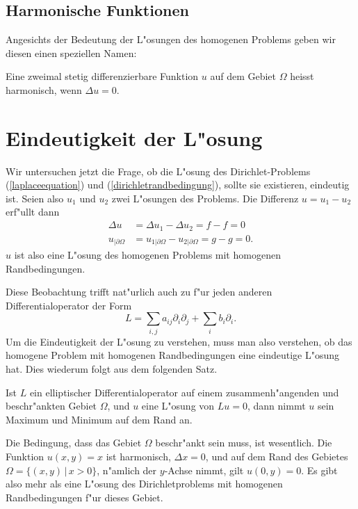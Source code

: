 \subsection{Harmonische Funktionen}
Angesichts der Bedeutung der L"osungen des homogenen Problems
geben wir diesen einen speziellen Namen:

\begin{definition}
Eine zweimal stetig differenzierbare Funktion $u$ auf dem Gebiet $\Omega$
heisst harmonisch, wenn $\Delta u=0$.
\end{definition}

\section{Eindeutigkeit der L"osung}
Wir untersuchen jetzt die Frage, ob die L"osung des 
Dirichlet-Problems (\ref{laplaceequation}) und
(\ref{dirichletrandbedingung}), sollte sie existieren, eindeutig ist.
Seien also $u_1$ und $u_2$ zwei L"osungen des Problems. Die Differenz
$u=u_1-u_2$ erf"ullt dann
\begin{align*}
\Delta u&=\Delta u_1-\Delta u_2=f-f=0\\
u_{|\partial\Omega}&=u_{1|\partial\Omega}-u_{2|\partial\Omega}=g-g=0.
\end{align*}
$u$ ist also eine L"osung des homogenen Problems mit homogenen
Randbedingungen.

Diese Beobachtung trifft nat"urlich auch zu f"ur jeden anderen
Differentialoperator der Form
\[
L=\sum_{i,j}a_{ij}\partial_i\partial_j+\sum_i b_i\partial_i.
\]
Um die Eindeutigkeit der L"osung zu verstehen, muss man also verstehen,
ob das homogene Problem mit homogenen Randbedingungen eine
eindeutige L"osung hat. Dies wiederum folgt aus dem folgenden Satz.

\begin{satz}
\label{maximumprinzip}
Ist $L$ ein elliptischer Differentialoperator auf einem zusammenh"angenden
und beschr"ankten Gebiet $\Omega$,
und $u$ eine L"osung von $Lu=0$,
dann nimmt $u$ sein Maximum und Minimum auf dem Rand an.
\end{satz}

Die Bedingung, dass das Gebiet $\Omega$ beschr"ankt sein muss, ist
wesentlich.
Die Funktion $u(x,y)=x$ ist harmonisch, $\Delta x=0$, und auf
dem Rand des Gebietes $\Omega=\{(x,y)\,|\,x>0\}$, n"amlich
der $y$-Achse nimmt, gilt $u(0,y)=0$.
Es gibt also mehr als eine L"osung des Dirichletproblems mit
homogenen Randbedingungen f"ur dieses Gebiet.


